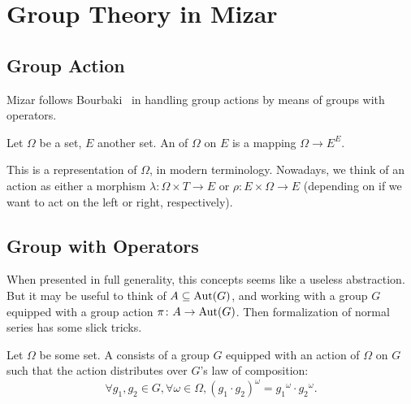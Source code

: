 \chapter{Group Theory in Mizar}












\section{Group Action}

Mizar follows Bourbaki~\cite{bourbaki1974elements} in handling group
actions by means of groups with operators.

\begin{definition}
Let $\Omega$ be a set, $E$ another set. An  of $\Omega$
on $E$ is a mapping $\Omega\to E^{E}$.
\end{definition}

This is a representation of $\Omega$, in modern terminology. Nowadays,
we think of an action as either a morphism $\lambda\colon\Omega\times T\to E$
or $\rho\colon E\times\Omega\to E$ (depending on if we want to act on
the left or right, respectively).

\section{Group with Operators}

When presented in full generality, this concepts seems like a useless
abstraction. But it may be useful to think of $A\subseteq\operatorname{Aut}(G)$, and
working with a group $G$ equipped with a group action $\pi\colon A\to\operatorname{Aut}(G)$.
Then formalization of normal series has some slick tricks.

\begin{definition}
Let $\Omega$ be some set. A 
consists of a group $G$ equipped with an action of $\Omega$ on $G$ such
that the action distributes over $G$'s law of composition:
\begin{equation}
  \forall g_{1},g_{2}\in G,\forall\omega\in\Omega,
  (g_{1}\cdot g_{2})^{\omega} = {g_{1}}^{\omega}\cdot{g_{2}}^{\omega}.
\end{equation}
\end{definition}

